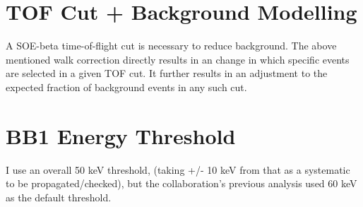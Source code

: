 \section{TOF Cut + Background Modelling}
	A SOE-beta time-of-flight cut is necessary to reduce background.  The above mentioned walk correction directly results in an change in which specific events are selected in a given TOF cut.  It further results in an adjustment to the expected fraction of background events in any such cut.
	
	

\section{BB1 Energy Threshold}
	I use an overall 50 keV threshold, (taking +/- 10 keV from that as a systematic to be propagated/checked), but the collaboration's previous analysis used 60 keV as the default threshold.
	
